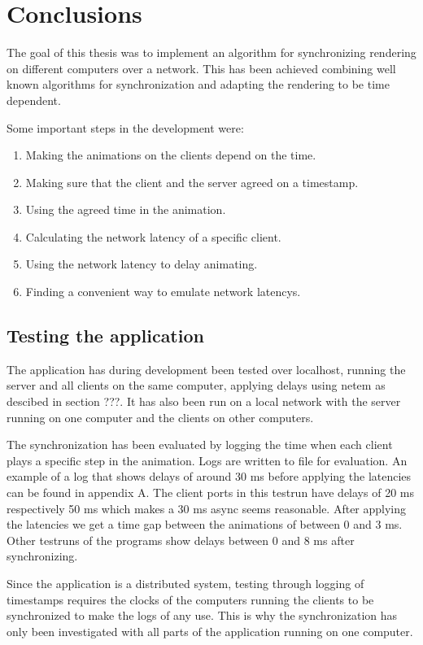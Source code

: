 \chapter{Conclusions}
The goal of this thesis was to implement an algorithm for synchronizing rendering on different computers over a network. This has been achieved combining well known algorithms for synchronization and adapting the rendering to be time dependent. 

Some important steps in the development were:
\begin{enumerate}
  \item Making the animations on the clients depend on the time. 
  \item Making sure that the client and the server agreed on a timestamp.
  \item Using the agreed time in the animation.
  \item Calculating the network latency of a specific client.
  \item Using the network latency to delay animating. 
  \item Finding a convenient way to emulate network latencys.
\end{enumerate}

\section {Testing the application}
The application has during development been tested over localhost, running the server and all clients on the same computer, applying delays using netem as descibed in section ???. It has also been run on a local network with the server running on one computer and the clients on other computers. 

The synchronization has been evaluated by logging the time when each client plays a specific step in the animation. Logs are written to file for evaluation. An example of a log that shows delays of around 30 ms before applying the latencies can be found in appendix A. The client ports in this testrun have delays of 20 ms respectively 50 ms which makes a 30 ms async seems reasonable. After applying the latencies we get a time gap between the animations of between 0 and 3 ms. Other testruns of the programs show delays between 0 and 8 ms after synchronizing. 

Since the application is a distributed system, testing through logging of timestamps requires the clocks of the computers running the clients to be synchronized to make the logs of any use. This is why the synchronization has only been investigated with all parts of the application running on one computer. 

